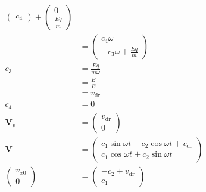 \documentclass{article}
\begin{document}
\begin{enumerate}
\begin{align*}
\begin{pmatrix}
                                            c_4
                                          \end{pmatrix} + \begin{pmatrix}
                                                            0 \\
                                                            \frac{E q}{m}
                                                          \end{pmatrix}          \\
                          & = \begin{pmatrix}
                                c_4 \omega \\
                                -c_3 \omega + \frac{E q}{m}
                              \end{pmatrix}                          \\
          c_3             & = \frac{E q}{m \omega}                                \\
                          & = \frac{E}{B}                                         \\
                          & = v_\text{dr}                                         \\
          c_4             & = 0                                                   \\
          \mathbf{V}_p    & = \begin{pmatrix}
                                v_\text{dr} \\
                                0
                              \end{pmatrix}                                      \\
          \mathbf{V}      & = \begin{pmatrix}
                                c_1 \sin \omega t - c_2 \cos \omega t + v_\text{dr} \\
                                c_1 \cos \omega t + c_2 \sin \omega t
                              \end{pmatrix} \\
          \begin{pmatrix}
            v_{x0} \\
            0
          \end{pmatrix} & = \begin{pmatrix}
                              -c_2 + v_\text{dr} \\
                              c_1

\end{pmatrix}
\end{align*}
\end{enumerate}
\end{document}
